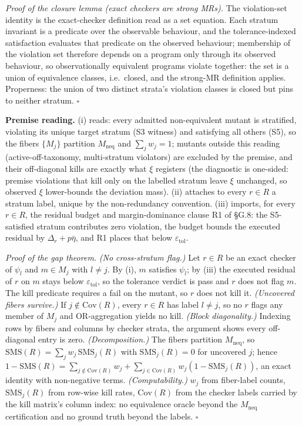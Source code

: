 \documentclass[review,12pt,authoryear]{elsarticle}
\begin{document}
\emph{Proof of the closure lemma (exact checkers are strong MRs).} The
violation-set identity is the exact-checker definition read as a set
equation. Each stratum invariant is a predicate over the observable
behaviour, and the tolerance-indexed satisfaction evaluates that
predicate on the observed behaviour; membership of the violation set
therefore depends on a program only through its observed behaviour, so
observationally equivalent programs violate together: the set is a
union of equivalence classes, i.e.\ closed, and the strong-MR
definition applies. Properness: the union of two distinct strata's
violation classes is closed but pins to neither stratum. $\square$

\textbf{Premise reading.} (i) reads: every admitted non-equivalent
mutant is stratified, violating its unique target stratum (S3 witness)
and satisfying all others (S5), so the fibers $\{M_j\}$ partition
$M_{\mathrm{neq}}$ and $\sum_j w_j = 1$; mutants outside this reading
(active-off-taxonomy, multi-stratum violators) are excluded by the
premise, and their off-diagonal kills are exactly what $\xi$ registers
(the diagnostic is one-sided: premise violations that kill only on the
labelled stratum leave $\xi$ unchanged, so observed $\xi$ lower-bounds
the deviation mass). (ii) attaches to every $r \in R$ a stratum label,
unique by the non-redundancy convention. (iii) imports, for every
$r \in R$, the residual budget and margin-dominance clause R1 of §G.8:
the S5-satisfied stratum contributes zero violation, the budget bounds
the executed residual by $\Delta_r + p\bar\eta$, and R1 places that
below $\varepsilon_{\mathrm{tol}}$.

\emph{Proof of the gap theorem.} \emph{(No cross-stratum flag.)} Let
$r \in R$ be an exact checker of $\psi_l$ and $m \in M_j$ with
$l \neq j$. By (i), $m$ satisfies $\psi_l$; by (iii) the executed
residual of $r$ on $m$ stays below $\varepsilon_{\mathrm{tol}}$, so the
tolerance verdict is pass and $r$ does not flag $m$. The kill predicate
requires a fail on the mutant, so $r$ does not kill it.
\emph{(Uncovered fibers survive.)} If $j \notin \mathrm{Cov}(R)$, every
$r \in R$ has label $l \neq j$, so no $r$ flags any member of $M_j$ and
OR-aggregation yields no kill. \emph{(Block diagonality.)} Indexing rows
by fibers and columns by checker strata, the argument shows every
off-diagonal entry is zero. \emph{(Decomposition.)} The fibers partition
$M_{\mathrm{neq}}$, so
$\mathrm{SMS}(R) = \sum_j w_j\,\mathrm{SMS}_j(R)$ with
$\mathrm{SMS}_j(R) = 0$ for uncovered $j$; hence
$1 - \mathrm{SMS}(R) = \sum_{j \notin \mathrm{Cov}(R)} w_j + \sum_{j \in \mathrm{Cov}(R)} w_j (1 - \mathrm{SMS}_j(R))$,
an exact identity with non-negative terms. \emph{(Computability.)}
$w_j$ from fiber-label counts, $\mathrm{SMS}_j(R)$ from row-wise kill
rates, $\mathrm{Cov}(R)$ from the checker labels carried by the kill
matrix's column index: no equivalence oracle beyond the
$M_{\mathrm{neq}}$ certification and no ground truth beyond the labels.
$\square$
\end{document}
